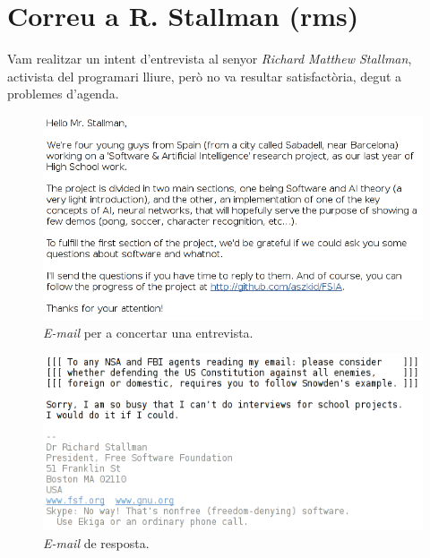 \clearpage %
\addappheadtotoc
\appendixpage
\chapter{Correu a R. Stallman (rms)}
Vam realitzar un intent d'entrevista al senyor \emph{Richard Matthew Stallman}, 
activista del programari lliure, però no va resultar satisfactòria, degut a
problemes d'agenda.

\begin{figure}[ht!]
\centering
\includegraphics[width=120mm]{data/stallman_2.png}
\caption{\emph{E-mail} per a concertar una entrevista.}
\end{figure}
\begin{figure}[ht!]
\centering
\includegraphics[width=120mm]{data/stallman_1.png}
\caption{\emph{E-mail} de resposta.}
\end{figure}
